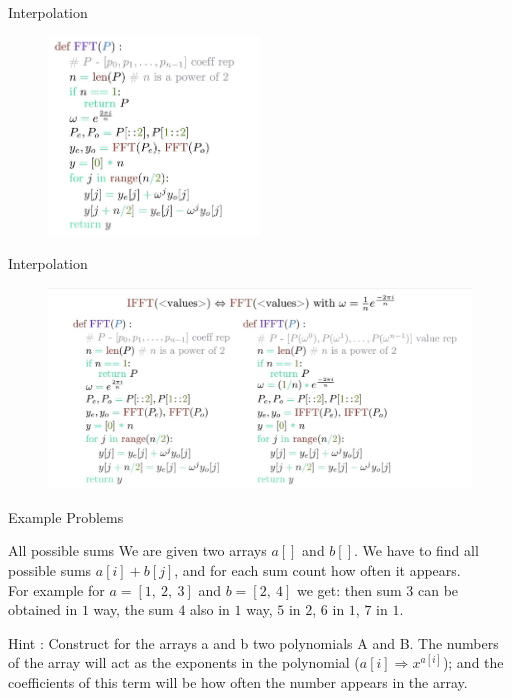 \documentclass{beamer}
\begin{document}
\begin{frame}{Interpolation}
    
    \begin{figure}
        \centering
        \includegraphics[width=0.5\textwidth]{code1.jpg}
        
        \label{fig:enter-label}
    \end{figure}
    
\end{frame}
\begin{frame}{Interpolation}
    
    \begin{figure}
        \centering
        \includegraphics[width=1\textwidth]{code2.jpg}
        
        \label{fig:enter-label}
    \end{figure}
    
\end{frame}


\begin{frame}{Example Problems}
        \begin{block}{All possible sums }
            We are given two arrays $a[]$ and $b[]$. We have to find all possible sums $a[i] + b[j]$, and for each sum count how often it appears. \\

For example for $a = [1,~ 2,~ 3]$ and $b = [2,~ 4]$ we get: then sum $3$ can be obtained in $1$ way, the sum $4$ also in $1$ way, $5$ in $2$, $6$ in $1$, $7$ in $1$. \end{block}
\begin{block}{Hint : }
Construct for the arrays a and b two polynomials A and B. The numbers of the array will
act as the exponents in the polynomial ($a[i] \Rightarrow x^{a[i]}$);  and the coefficients of this term will be how
often the number appears in the array.
        \end{block}
    \end{frame}
\end{document}
